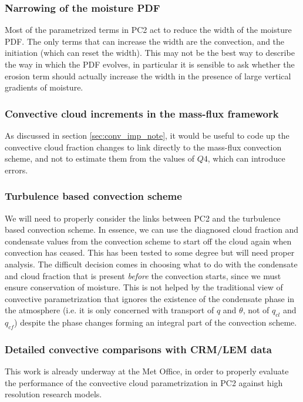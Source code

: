 \documentclass{UMDP_article}
\begin{document}
\subsubsection{Narrowing of the moisture PDF}
Most of the parametrized terms in PC2 act to reduce the width of the
moisture PDF. The only terms that can increase the width are the convection,
and the initiation (which can reset the width). This may not be the
best way to describe the way in which the PDF evolves, in particular it
is sensible to ask whether the erosion term should actually increase
the width in the presence of large vertical gradients of moisture. 

\subsubsection{Convective cloud increments in the mass-flux framework}
As discussed in section \ref{sec:conv_imp_note}, it would be useful
to code up the convective cloud fraction changes to link directly to
the mass-flux convection scheme, and not to estimate them from the values
of $Q4$, which can introduce errors.

\subsubsection{Turbulence based convection scheme}
\label{sec:tbcs}
We will need to properly consider the links between PC2 and the
turbulence based convection scheme. In essence, we can use the diagnosed
cloud fraction and condensate values from the convection scheme to
start off the cloud again when convection has ceased. This has been
tested to some degree but will need proper analysis. The difficult
decision comes in choosing what to do with the condensate and cloud fraction
that is present \textit{before} the convection starts, since we must
ensure conservation of moisture. This is not helped by the traditional
view of convective parametrization that ignores the existence of the condensate
phase in the atmosphere (i.e. it is only concerned with transport of $q$ and
$\theta$, not of $q_{cl}$ and $q_{cf}$) despite the phase changes forming
an integral part of the convection scheme.

\subsubsection{Detailed convective comparisons with CRM/LEM data}
This work is already underway at the Met Office, in order to properly
evaluate the performance of the convective cloud parametrization
in PC2 against high resolution research models.
\end{document}
